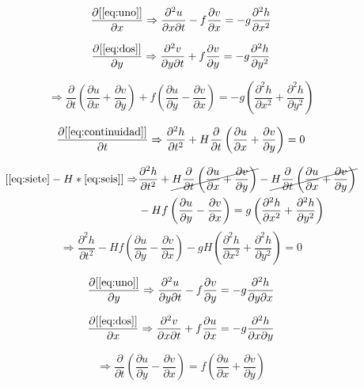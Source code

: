 \documentclass{article}
\newcommand\pder[2]{\ensuremath {\dfrac{\partial#1}{\partial#2}}}
\newcommand{\ppder}[2]{ \ensuremath {\dfrac{\partial^2 #1}{\partial #2^2}}}
\newcommand{\ppcder}[3]{ \ensuremath {\dfrac{\partial^2 #1}{\partial #2\partial #3}}}
\begin{document}
\begin{equation}
	\pder{[\eqref{eq:uno}]}{x} \Rightarrow
	\ppcder{u}{x}{t} - f\pder{v}{x} = -g \ppder{h}{x}
	\label{eq:cuatro}
\end{equation}

\begin{equation}
	\pder{[\eqref{eq:dos}]}{y} \Rightarrow
	\ppcder{v}{y}{t} + f\pder{v}{y} = -g \ppder{h}{y}
	\label{eq:cinco}
\end{equation}

\newcommand{\uymvx}{\left(\pder{u}{y}-\pder{v}{x}\right)}
\newcommand{\uxpvy}{\left(\pder{u}{x}+\pder{v}{y}\right)}
\newcommand{\hxphy}{\left(\ppder{h}{x}+\ppder{h}{y}\right)}

\begin{equation}
	[\eqref{eq:cuatro}+\eqref{eq:cinco}] \Rightarrow
	\pder{}{t}\uxpvy + f\uymvx = -g \hxphy
	\label{eq:seis}
\end{equation}

\begin{equation}
	\pder{[\eqref{eq:continuidad}]}{t} \Rightarrow
	\ppder{h}{t} + H\pder{}{t}\uxpvy = 0
	\label{eq:siete}
\end{equation}

\begin{equation}
    \begin{split}
	[\eqref{eq:siete}-H*\eqref{eq:seis}] \Rightarrow &
	\ppder{h}{t} + \cancel{H\pder{}{t}\uxpvy} -
	\cancel{H\pder{}{t}\uxpvy} \\
	& - Hf\uymvx = g \hxphy
    \end{split}
    \nonumber
\end{equation}
\begin{equation}
    \Rightarrow \ppder{h}{t} - Hf\uymvx
	 -gH \hxphy = 0
    \label{eq:ocho}
\end{equation}

\begin{equation}
	\pder{[\eqref{eq:uno}]}{y} \Rightarrow
	\ppcder{u}{y}{t} - f\pder{v}{y} = -g \ppcder{h}{y}{x}
	\label{eq:nueve}
\end{equation}

\begin{equation}
	\pder{[\eqref{eq:dos}]}{x} \Rightarrow
	\ppcder{v}{x}{t} + f\pder{u}{x} = -g \ppcder{h}{x}{y}
	\label{eq:diez}
\end{equation}

\begin{equation}
	[\eqref{eq:nueve}+\eqref{eq:diez}] \Rightarrow
	\pder{}{t} \uymvx = f \uxpvy
	\label{eq:once}
\end{equation}
\end{document}

